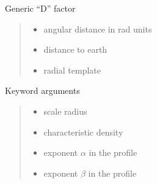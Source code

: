 \documentclass[letterpaper,10pt,english]{sphinxmanual}
\begin{document}
\begin{fulllineitems}
\label{\detokenize{diffsph.profiles:diffsph.profiles.hfactors.D_factor}}
\pysigstartsignatures
{}
\pysigstopsignatures
\sphinxAtStartPar
Generic “D” factor
\begin{quote}\begin{description}
\begin{itemize}
\item {} 
\sphinxAtStartPar
{} \textendash{} angular distance in rad units

\item {} 
\sphinxAtStartPar
{} \textendash{} distance to earth

\item {} 
\sphinxAtStartPar
{} \textendash{} radial template

\end{itemize}

\end{description}\end{quote}

\sphinxAtStartPar
Keyword arguments
\begin{quote}\begin{description}
\begin{itemize}
\item {} 
\sphinxAtStartPar
{} \textendash{} scale radius

\item {} 
\sphinxAtStartPar
{} \textendash{} characteristic density

\item {} 
\sphinxAtStartPar
{} \textendash{} exponent \(\alpha\) in the {\hyperref[\detokenize{diffsph.profiles:diffsph.profiles.templates.hdz}]{}} profile

\item {} 
\sphinxAtStartPar
{} \textendash{} exponent \(\beta\) in the {\hyperref[\detokenize{diffsph.profiles:diffsph.profiles.templates.hdz}]{}} profile


\end{itemize}
\end{description}
\end{quote}
\end{fulllineitems}
\end{document}
